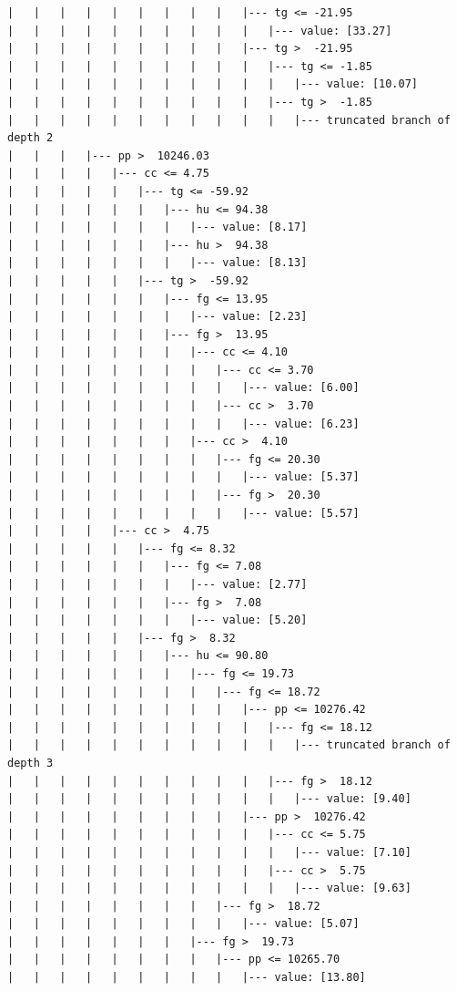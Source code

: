 \documentclass[UTF8, a4paper]{ctexart}
\begin{document}
\begin{lstlisting}
|   |   |   |   |   |   |   |   |   |--- tg <= -21.95
|   |   |   |   |   |   |   |   |   |   |--- value: [33.27]
|   |   |   |   |   |   |   |   |   |--- tg >  -21.95
|   |   |   |   |   |   |   |   |   |   |--- tg <= -1.85
|   |   |   |   |   |   |   |   |   |   |   |--- value: [10.07]
|   |   |   |   |   |   |   |   |   |   |--- tg >  -1.85
|   |   |   |   |   |   |   |   |   |   |   |--- truncated branch of depth 2
|   |   |   |--- pp >  10246.03
|   |   |   |   |--- cc <= 4.75
|   |   |   |   |   |--- tg <= -59.92
|   |   |   |   |   |   |--- hu <= 94.38
|   |   |   |   |   |   |   |--- value: [8.17]
|   |   |   |   |   |   |--- hu >  94.38
|   |   |   |   |   |   |   |--- value: [8.13]
|   |   |   |   |   |--- tg >  -59.92
|   |   |   |   |   |   |--- fg <= 13.95
|   |   |   |   |   |   |   |--- value: [2.23]
|   |   |   |   |   |   |--- fg >  13.95
|   |   |   |   |   |   |   |--- cc <= 4.10
|   |   |   |   |   |   |   |   |--- cc <= 3.70
|   |   |   |   |   |   |   |   |   |--- value: [6.00]
|   |   |   |   |   |   |   |   |--- cc >  3.70
|   |   |   |   |   |   |   |   |   |--- value: [6.23]
|   |   |   |   |   |   |   |--- cc >  4.10
|   |   |   |   |   |   |   |   |--- fg <= 20.30
|   |   |   |   |   |   |   |   |   |--- value: [5.37]
|   |   |   |   |   |   |   |   |--- fg >  20.30
|   |   |   |   |   |   |   |   |   |--- value: [5.57]
|   |   |   |   |--- cc >  4.75
|   |   |   |   |   |--- fg <= 8.32
|   |   |   |   |   |   |--- fg <= 7.08
|   |   |   |   |   |   |   |--- value: [2.77]
|   |   |   |   |   |   |--- fg >  7.08
|   |   |   |   |   |   |   |--- value: [5.20]
|   |   |   |   |   |--- fg >  8.32
|   |   |   |   |   |   |--- hu <= 90.80
|   |   |   |   |   |   |   |--- fg <= 19.73
|   |   |   |   |   |   |   |   |--- fg <= 18.72
|   |   |   |   |   |   |   |   |   |--- pp <= 10276.42
|   |   |   |   |   |   |   |   |   |   |--- fg <= 18.12
|   |   |   |   |   |   |   |   |   |   |   |--- truncated branch of depth 3
|   |   |   |   |   |   |   |   |   |   |--- fg >  18.12
|   |   |   |   |   |   |   |   |   |   |   |--- value: [9.40]
|   |   |   |   |   |   |   |   |   |--- pp >  10276.42
|   |   |   |   |   |   |   |   |   |   |--- cc <= 5.75
|   |   |   |   |   |   |   |   |   |   |   |--- value: [7.10]
|   |   |   |   |   |   |   |   |   |   |--- cc >  5.75
|   |   |   |   |   |   |   |   |   |   |   |--- value: [9.63]
|   |   |   |   |   |   |   |   |--- fg >  18.72
|   |   |   |   |   |   |   |   |   |--- value: [5.07]
|   |   |   |   |   |   |   |--- fg >  19.73
|   |   |   |   |   |   |   |   |--- pp <= 10265.70
|   |   |   |   |   |   |   |   |   |--- value: [13.80]

\end{lstlisting}
\end{document}
